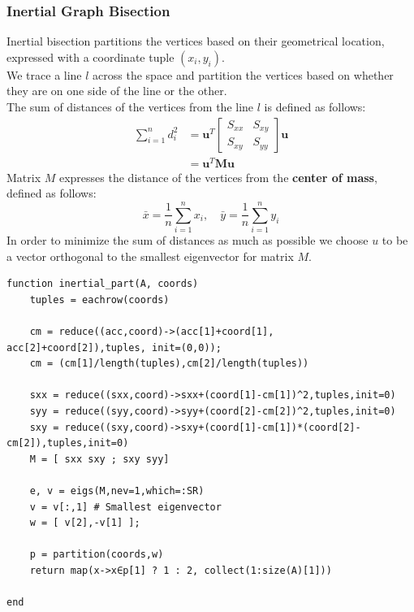 \documentclass[unicode,11pt,a4paper,oneside,numbers=endperiod,openany]{scrartcl}
\begin{document}
\subsubsection*{Inertial Graph Bisection}
Inertial bisection partitions the vertices based on their geometrical location, expressed with a coordinate tuple $(x_i,y_i)$.\\
We trace a line $l$ across the space and partition the vertices based on whether they are on one side of the line or the other.\\
The sum of distances of the vertices from the line $l$ is defined as follows:
\begin{align*}
\sum_{i=1}^n d_i^2 &=\mathbf{u}^T\left[\begin{array}{ll}S_{x x} & S_{x y} \\ S_{x y} & S_{y y}\end{array}\right] \mathbf{u}\\
&=\mathbf{u}^T \mathbf{M} \mathbf{u}
\end{align*}
Matrix $M$ expresses the distance of the vertices from the \textbf{center of mass}, defined as follows:
\[
\bar{x}=\frac{1}{n} \sum_{i=1}^n x_i, \quad \bar{y}=\frac{1}{n} \sum_{i=1}^n y_i
\]
In order to minimize the sum of distances as much as possible we choose $u$ to be a vector orthogonal to the smallest eigenvector for matrix $M$.


\begin{verbatim}
function inertial_part(A, coords)
    tuples = eachrow(coords)
    
    cm = reduce((acc,coord)->(acc[1]+coord[1], acc[2]+coord[2]),tuples, init=(0,0));
    cm = (cm[1]/length(tuples),cm[2]/length(tuples))

    sxx = reduce((sxx,coord)->sxx+(coord[1]-cm[1])^2,tuples,init=0)
    syy = reduce((syy,coord)->syy+(coord[2]-cm[2])^2,tuples,init=0) 
    sxy = reduce((sxy,coord)->sxy+(coord[1]-cm[1])*(coord[2]-cm[2]),tuples,init=0)
    M = [ sxx sxy ; sxy syy]

    e, v = eigs(M,nev=1,which=:SR)
    v = v[:,1] # Smallest eigenvector
    w = [ v[2],-v[1] ];

    p = partition(coords,w)
    return map(x->x∈p[1] ? 1 : 2, collect(1:size(A)[1]))

end
\end{verbatim}
\end{document}
